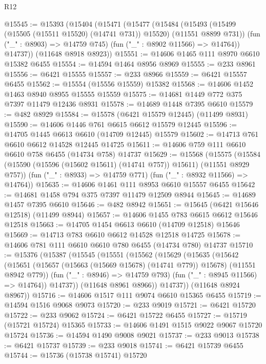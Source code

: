 \begin{lexlean}{R12}
\begin{coremodule}
{{{{{{{{{{{{{{{{{{{{{{{{{{{{{{{{{{{{{{{{{{{{{{{{{{{{{{{{{{{{{{{{{{{{{{{{{{{{{{{{{{@15545 := @15393
    (@15404
      (@15471
        (@15477
          (@15484
            (@15493 (@15499 (@15505 (@15511 @15520) (@14741 @731)) @15520) (@11551 @8899 @731))
            (fun ("_" : @8903) => @14759 @745)
            (fun ("_" : @8902 @11566) => @14764))
          @14737))
      (@11648 @8918 @8923))
@15551 := @14606 @1465 @111 @8970 @6610 @15382 @6455
@15554 := @14594 @1464 @8956 @8969
@15555 := @233 @8961
@15556 := @6421 @15555
@15557 := @233 @8966
@15559 := @6421 @15557 @6455
@15562 := @15554 (@15556 @15559) @15382
@15568 := @14606 @1452 @1463 @8940 @8955 @15555 @15559
@15575 := @14681 @1449 @772 @375 @7397 @11479 @12436 @8931
@15578 := @14689 @1448 @7395 @6610
@15579 := @482 @8929
@15584 := @15578 (@6421 @15579 @12445) (@11499 @8931)
@15590 := @14606 @1446 @761 @6615 @6612 @15579 @12445
@15596 := @14705 @1445 @6613 @6610 (@14709 @12445) @15579
@15602 := @14713 @761 @6610 @6612 @14528 @12445 @14725
@15611 := @14606 @759 @111 @6610 @6610 @758 @6455 (@14734 @758) @14737
@15629 := @15568
    (@15575
      (@15584 (@15590 (@15596 (@15602 @15611) (@14741 @757)) @15611) (@11551 @8929 @757))
      (fun ("_" : @8933) => @14759 @771)
      (fun ("_" : @8932 @11566) => @14764))
@15635 := @14606 @1461 @111 @8953 @6610 @15557 @6455
@15642 := @14681 @1458 @794 @375 @7397 @11479 @12509 @8944
@15645 := @14689 @1457 @7395 @6610
@15646 := @482 @8942
@15651 := @15645 (@6421 @15646 @12518) (@11499 @8944)
@15657 := @14606 @1455 @783 @6615 @6612 @15646 @12518
@15663 := @14705 @1454 @6613 @6610 (@14709 @12518) @15646
@15669 := @14713 @783 @6610 @6612 @14528 @12518 @14725
@15678 := @14606 @781 @111 @6610 @6610 @780 @6455 (@14734 @780) @14737
@15710 := @15376
    (@15387
      (@15545
        (@15551
          (@15562
            (@15629
              (@15635
                (@15642
                  (@15651
                    (@15657 (@15663 (@15669 @15678) (@14741 @779)) @15678)
                    (@11551 @8942 @779))
                  (fun ("_" : @8946) => @14759 @793)
                  (fun ("_" : @8945 @11566) => @14764))
                @14737))
            (@11648 @8961 @8966))
          @14737))
      (@11648 @8924 @8967))
@15716 := @14606 @1517 @111 @9074 @6610 @15365 @6455
@15719 := @14594 @1516 @9068 @9073
@15720 := @233 @9019
@15721 := @6421 @15720
@15722 := @233 @9062
@15724 := @6421 @15722 @6455
@15727 := @15719 (@15721 @15724) @15365
@15733 := @14606 @1491 @1515 @9022 @9067 @15720 @15724
@15736 := @14594 @1490 @9008 @9021
@15737 := @233 @9013
@15738 := @6421 @15737
@15739 := @233 @9018
@15741 := @6421 @15739 @6455
@15744 := @15736 (@15738 @15741) @15720
}}}}}}}}}}}}}}}}}}}}}}}}}}}}}}}}}}}}}}}}}}}}}}}}}}}}}}}}}}}}}}}}}}}}}}}}}}}}}}}}}}
\end{coremodule}
\end{lexlean}

